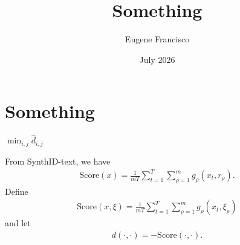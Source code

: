 \documentclass[twocolumn,9pt]{extarticle}
\title{Something}
\author{Eugene Francisco}
\date{July 2026}
\begin{document}
\maketitle

\section{Something}
\begin{algorithm}[t]
\label{algo:test_statistic}
\caption{Test statistic $\phi$ (Kuditipudi et al.)}
\Return $\min_{i,j} \hat{d}_{i,j}$\;
\end{algorithm}
From SynthID-text, we have
\begin{align*}
	\mathrm{Score}(x) = \frac{1}{mT}\sum_{t = 1}^T\sum_{\rho = 1}^m g_\rho(x_t, r_\rho).
\end{align*}
Define
\begin{align}
	\mathrm{Score}(x, \xi ) = \frac{1}{mT}\sum_{t = 1}^T\sum_{\rho = 1}^m g_\rho(x_t, \xi_\rho)\label{eq:score_func}
\end{align}
and let
\begin{align}
	d(\cdot, \cdot) = -\mathrm{Score}(\cdot, \cdot).\label{eq:alignment_func}
\end{align}
\end{document}
